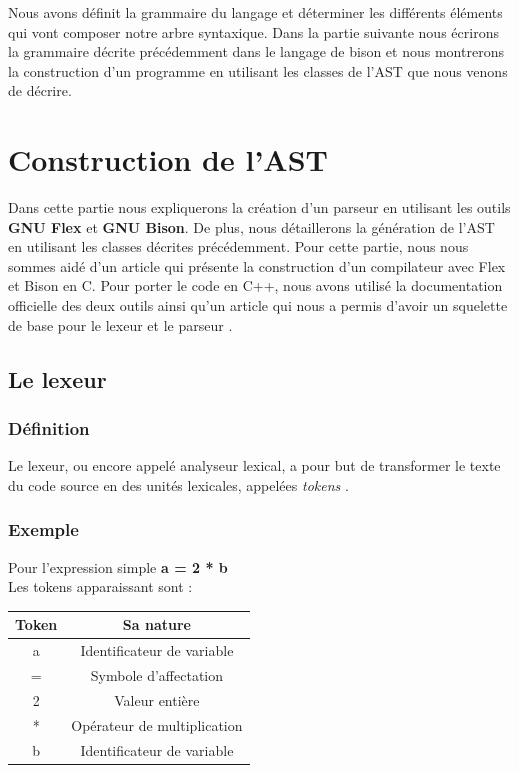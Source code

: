 \documentclass[a4paper]{article}%
\begin{document}
Nous avons définit la grammaire du langage et déterminer les différents éléments
qui vont composer notre arbre syntaxique. Dans la partie suivante nous écrirons
la grammaire décrite précédemment dans le langage de bison et nous montrerons
la construction d'un programme en utilisant les classes de l'AST que nous
venons de décrire.


\clearpage{}

\section{Construction de l'AST}

Dans cette partie nous expliquerons la création d'un parseur en utilisant les
outils \textbf{GNU Flex} et \textbf{GNU Bison}. De plus, nous détaillerons la
génération de l'AST en utilisant les classes décrites précédemment. Pour cette
partie, nous nous sommes aidé d'un article \cite{compilerFlexBison} qui présente
la construction d'un compilateur avec Flex et Bison en C. Pour porter le code en
C++, nous avons utilisé la documentation officielle des deux outils ainsi qu'un
article qui nous a permis d'avoir un squelette de base pour le lexeur et le
parseur \cite{cppparsing}.

\subsection{Le lexeur}

\subsubsection*{Définition}

Le lexeur, ou encore appelé analyseur lexical, a pour but de transformer le
texte du code source en des unités lexicales, appelées \textit{tokens}
\cite{flexBisonHandbook}. \\

\subsubsection*{Exemple}

Pour l'expression simple \textbf{a = 2 * b} \\
Les tokens apparaissant sont : \\
\begin{center}
  \begin{tabular}{ | c | c | }
    \hline
    \textbf{Token} & \textbf{Sa nature} \\
    \hline
    a & Identificateur de variable \\
    \hline
    = & Symbole d'affectation \\
    \hline
    2 & Valeur entière \\
    \hline
    * & Opérateur de multiplication \\
    \hline
    b & Identificateur de variable \\
    \hline
  \end{tabular}
\end{center}
\end{document}
